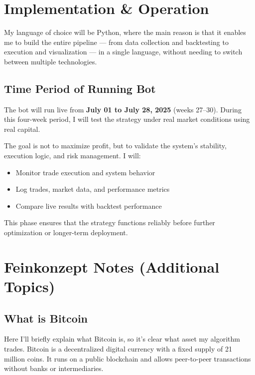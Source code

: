 \documentclass[9pt,a4paper,twocolumn,twoside]{tau-class/tau}
\begin{document}
\section{Implementation \& Operation}

My language of choice will be Python, where the main reason is that it enables me to build the entire pipeline — from data collection and backtesting to execution and visualization — in a single language, without needing to switch between multiple technologies.
\subsection{Time Period of Running Bot}

The bot will run live from \textbf{July 01 to July 28, 2025} (weeks 27–30). During this four-week period, I will test the strategy under real market conditions using real capital.

The goal is not to maximize profit, but to validate the system’s stability, execution logic, and risk management. I will:
\begin{itemize}
  \item Monitor trade execution and system behavior
  \item Log trades, market data, and performance metrics
  \item Compare live results with backtest performance
\end{itemize}

This phase ensures that the strategy functions reliably before further optimization or longer-term deployment.


\section{Feinkonzept Notes (Additional Topics)}




\subsection{What is Bitcoin}

Here I’ll briefly explain what Bitcoin is, so it’s clear what asset my algorithm trades. Bitcoin is a decentralized digital currency with a fixed supply of 21 million coins. It runs on a public blockchain and allows peer-to-peer transactions without banks or intermediaries.
\end{document}
